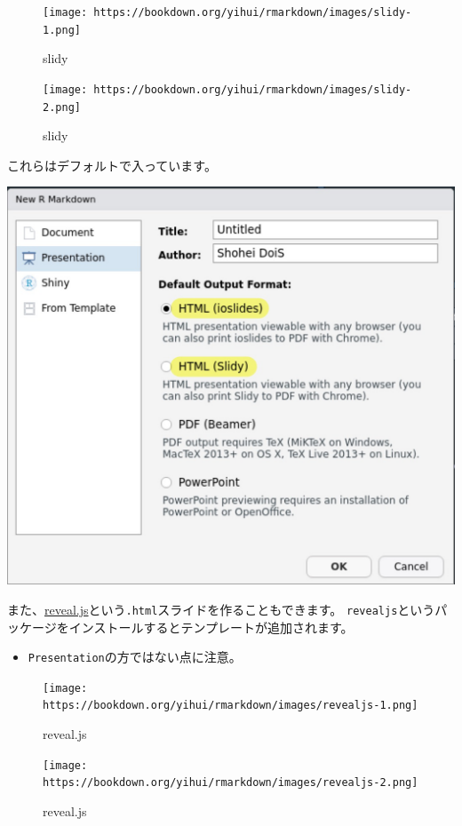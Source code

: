 \documentclass[]{bxjsreport}
\providecommand{\tightlist}{%
  \setlength{\itemsep}{0pt}\setlength{\parskip}{0pt}}
\begin{document}
\begin{figure}
\centering
\texttt{[image: https://bookdown.org/yihui/rmarkdown/images/slidy-1.png]}
\caption{slidy}
\end{figure}

\begin{figure}
\centering
\texttt{[image: https://bookdown.org/yihui/rmarkdown/images/slidy-2.png]}
\caption{slidy}
\end{figure}

これらはデフォルトで入っています。

\includegraphics{figures/rmarkdown_html7.jpg}

また、\href{https://revealjs.com/}{reveal.js}という\texttt{.html}スライドを作ることもできます。
\texttt{revealjs}というパッケージをインストールするとテンプレートが追加されます。

\begin{itemize}
\tightlist
\item
  \texttt{Presentation}の方ではない点に注意。
\end{itemize}

\begin{figure}
\centering
\texttt{[image: https://bookdown.org/yihui/rmarkdown/images/revealjs-1.png]}
\caption{reveal.js}
\end{figure}

\begin{figure}
\centering
\texttt{[image: https://bookdown.org/yihui/rmarkdown/images/revealjs-2.png]}
\caption{reveal.js}
\end{figure}
\end{document}
